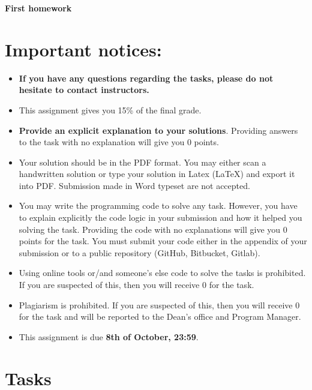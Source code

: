 \documentclass{article}
\begin{document}
\begin{tcolorbox}[colframe=ttblue, colback=ttblue!10]
\begin{center}
\begin{large}
\textbf{First homework}
\end{large}
\end{center}
\end{tcolorbox}

\section{Important notices:}
\begin{itemize}
    \item \textcolor{ttred}{\textbf{If you have any questions regarding the tasks, please do not hesitate to contact instructors.}} 
    \item This assignment gives you 15\% of the final grade.
    \item \textbf{Provide an explicit explanation to your solutions}. Providing answers to the task with no explanation will give you $0$ points.
    \item Your solution should be in the PDF format. You may either scan a handwritten solution or type your solution in Latex (\LaTeX) and export it into PDF. Submission made in Word typeset are not accepted.
    \item You may write the programming code to solve any task. However, you have to explain explicitly the code logic in your submission and how it helped you solving the task. Providing the code with no explanations will give you $0$ points for the task. You must submit your code either in the appendix of your submission or to a public repository (GitHub, Bitbucket, Gitlab).
    \item Using online tools or/and someone's else code to solve the tasks is prohibited. If you are suspected of this, then you will receive $0$ for the task.
    \item Plagiarism is prohibited. If you are suspected of this, then you will receive $0$ for the task and will be reported to the Dean's office and Program Manager.
    \item This assignment is due \textcolor{ttred} {\textbf{8th of October, 23:59}}. 
\end{itemize}

\newpage

\section*{Tasks}
\end{document}

